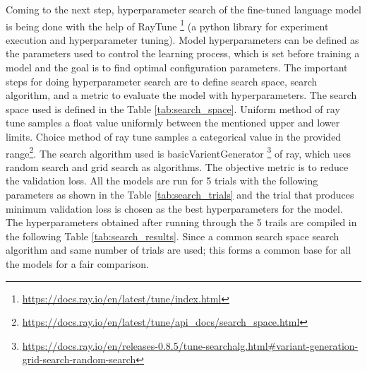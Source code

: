 Coming to the next step, hyperparameter search of the fine-tuned language model is being done with the help of RayTune \footnote{\url{https://docs.ray.io/en/latest/tune/index.html}} (a python library for experiment execution and hyperparameter tuning). Model hyperparameters can be defined as the parameters used to control the learning process, which is set before training a model \cite{bergstra2012random} and the goal is to find optimal configuration parameters. The important steps for doing hyperparameter search are to define search space, search algorithm, and a metric to evaluate the model with hyperparameters. The search space used is defined in the Table \ref{tab:search_space}. Uniform method of ray tune samples a float value uniformly between the mentioned upper and lower limits. Choice method of ray tune samples a categorical value in the provided range\footnote{\url{https://docs.ray.io/en/latest/tune/api_docs/search_space.html}}. The search algorithm used is basicVarientGenerator \footnote{\url{https://docs.ray.io/en/releases-0.8.5/tune-searchalg.html#variant-generation-grid-search-random-search}} of ray, which uses random search and grid search as algorithms. The objective metric is to reduce the validation loss. All the models are run for 5 trials with the following parameters as shown in the Table \ref{tab:search_trials} and the trial that produces minimum validation loss is chosen as the best hyperparameters for the model.  The hyperparameters obtained after running through the 5 trails are compiled in the following Table \ref{tab:search_results}. Since a common search space search algorithm and same number of trials are used; this forms a common base for all the models for a fair comparison.

